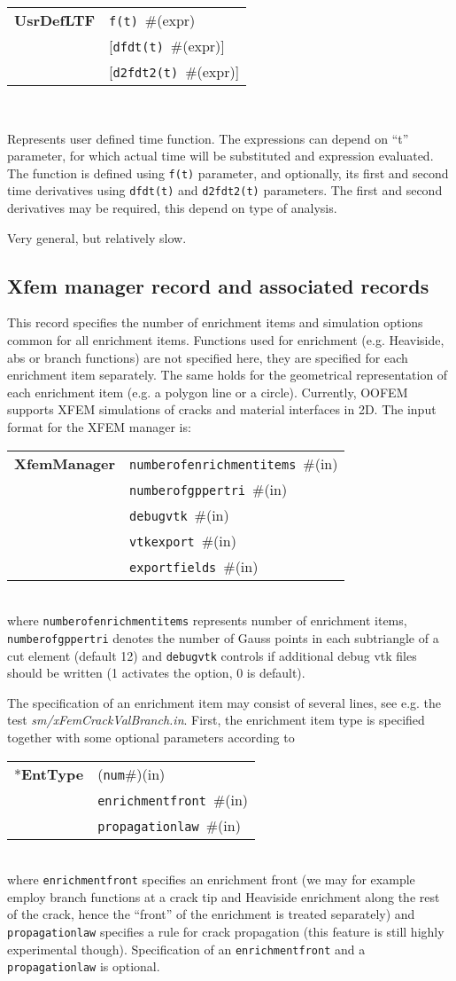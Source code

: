 \documentclass[a4paper]{article}
\newcommand{\param}[1]{\texttt{#1}} %
\newcommand{\optional}[1]{[#1]} %
\newcommand{\field}[2]{\param{#1}~\#{\tiny(#2)}} %
\newcommand{\optField}[2]{\optional{\field{#1}{#2}}}
\newcommand{\componentNum}{(\param{num}\#){\tiny(in)}} %
\newcommand{\entKeyword}[1]{*\textbf{#1}} %
\newcommand{\entKeywordInst}[1]{\textbf{#1}} %
\newenvironment{record}[1][]{\begin{tabular}{|ll}}{\end{tabular}\\}
\newcommand{\recentry}[2]{{#1}&{#2}\\}
\newcounter{rcc}
\newenvironment{record}[1][\textwidth]{\setcounter{rcc}{0}\rowcolors{1}{lightgray}{lightgray}\tabularx{#1}{llR} \hline}
               {\endtabularx}
\newcommand{\recentry}[2]{\ifthenelse{\value{rcc}>0}{$\backslash$ \\}{\setcounter{rcc}{1}}{#1}&{#2}&}
\begin{document}
\begin{itemize}
\begin{record}[0.9\textwidth]
  \recentry{\entKeywordInst{UsrDefLTF}}{\field{f(t)}{expr}}
  \recentry{}{\optField{dfdt(t)}{expr}}
  \recentry{}{\optField{d2fdt2(t)}{expr}}
\end{record}

Represents user defined time function.
The expressions can depend on ``t'' parameter, for which actual time will be substituted and
expression evaluated. The function is defined using \param{f(t)} parameter, and optionally, its first and second time derivatives using \param{dfdt(t)} and \param{d2fdt2(t)} parameters.
The first and second derivatives may be required, this depend on type of analysis.

Very general, but relatively slow.
\end{itemize}

\subsection{Xfem manager record and associated records}
\label{_XFEMManagerRecords}
This record specifies the number of enrichment items and simulation options
common for all enrichment items. Functions used for enrichment (e.g. Heaviside,
abs or branch functions) are not specified here, they are specified for each
enrichment item separately. The same holds for the geometrical representation of
each enrichment item (e.g. a polygon line or a circle). Currently, OOFEM
supports XFEM simulations of cracks and material interfaces in 2D. The input
format for the XFEM manager is:\\
\begin{record}
  \recentry{\entKeywordInst{XfemManager}}{\field{numberofenrichmentitems}{in}}
  \recentry{}{\field{numberofgppertri}{in}}
  \recentry{}{\field{debugvtk}{in}}
  \recentry{}{\field{vtkexport}{in}}
  \recentry{}{\field{exportfields}{in}}
\end{record}
where \param{numberofenrichmentitems} represents number of enrichment items,
\param{numberofgppertri} denotes the number of Gauss points in each subtriangle
of a cut element (default 12) and \param{debugvtk} controls if additional debug
vtk files should be written (1 activates the option, 0 is default).

The specification of an enrichment item may consist of several lines, see e.g.
the test \textit{sm/xFemCrackValBranch.in}. First, the enrichment item type is
specified together with some optional parameters according to\\
\noindent
\begin{record}
  \recentry{\entKeyword{EntType}}{\componentNum}
  \recentry{}{\field{enrichmentfront}{in}}
  \recentry{}{\field{propagationlaw}{in}}
\end{record}
where \param{enrichmentfront} specifies an enrichment front (we may for example
employ branch functions at a crack tip and Heaviside enrichment along the rest
of the crack, hence the ``front'' of the enrichment is treated separately) and
\param{propagationlaw} specifies a rule for crack propagation (this feature is
still highly experimental though). Specification of an \param{enrichmentfront}
and a \param{propagationlaw} is optional.
\end{document}
